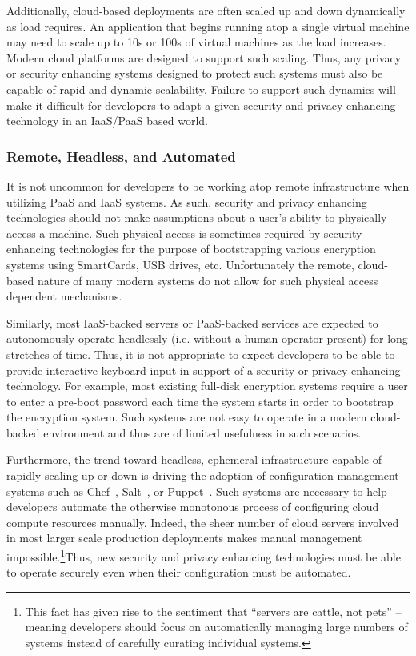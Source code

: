 Additionally, cloud-based deployments are often scaled up and down
dynamically as load requires. An application that begins running atop
a single virtual machine may need to scale up to 10s or 100s of
virtual machines as the load increases. Modern cloud platforms are
designed to support such scaling. Thus, any privacy or security
enhancing systems designed to protect such systems must also be
capable of rapid and dynamic scalability. Failure to support such
dynamics will make it difficult for developers to adapt a given
security and privacy enhancing technology in an IaaS/PaaS based world.

\subsubsection{Remote, Headless, and Automated}

It is not uncommon for developers to be working atop remote
infrastructure when utilizing PaaS and IaaS systems. As such, security
and privacy enhancing technologies should not make assumptions about a
user's ability to physically access a machine. Such physical access is
sometimes required by security enhancing technologies for the purpose
of bootstrapping various encryption systems using SmartCards, USB
drives, etc. Unfortunately the remote, cloud-based nature of many
modern systems do not allow for such physical access dependent
mechanisms.

Similarly, most IaaS-backed servers or PaaS-backed services are
expected to autonomously operate headlessly (i.e. without a human
operator present) for long stretches of time. Thus, it is not
appropriate to expect developers to be able to provide interactive
keyboard input in support of a security or privacy enhancing
technology. For example, most existing full-disk encryption systems
require a user to enter a pre-boot password each time the system
starts in order to bootstrap the encryption system. Such systems are
not easy to operate in a modern cloud-backed environment and thus are
of limited usefulness in such scenarios.

Furthermore, the trend toward headless, ephemeral infrastructure
capable of rapidly scaling up or down is driving the adoption of
configuration management systems such as Chef~\cite{chef},
Salt~\cite{salt}, or Puppet~\cite{puppet}. Such systems are necessary
to help developers automate the otherwise monotonous process of
configuring cloud compute resources manually. Indeed, the sheer number
of cloud servers involved in most larger scale production deployments
makes manual management impossible.\footnote{This fact has given rise
  to the sentiment that ``servers are cattle, not pets'' -- meaning
  developers should focus on automatically managing large numbers of
  systems instead of carefully curating individual systems.}Thus, new
security and privacy enhancing technologies must be able to operate
securely even when their configuration must be automated.


